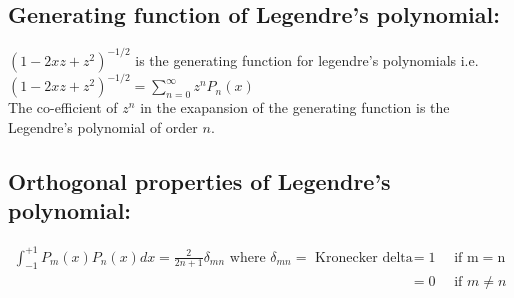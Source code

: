 \subsection{Generating function of Legendre's polynomial:}
$\left(1-2 x z+z^{2}\right)^{-1 / 2}$ is the generating function for legendre's polynomials i.e. $\left(1-2 x z+z^{2}\right)^{-1 / 2}=\sum_{n=0}^{\infty} z^{n} P_{n}(x)$\\
The co-efficient of $z^{n}$ in the exapansion of the generating function is the Legendre's polynomial of order $n$.
\subsection{Orthogonal properties of Legendre's polynomial:}
\begin{align*}
\int_{-1}^{+1} P_{m}(x) P_{n}(x) d x=\frac{2}{2 n+1} \delta_{m n} \text { where } \delta_{m n}=\text { Kronecker delta }&=1 \quad \text { if } \mathrm{m}=\mathrm{n}\\
&=0 \quad \text { if } m \neq n
\end{align*}

